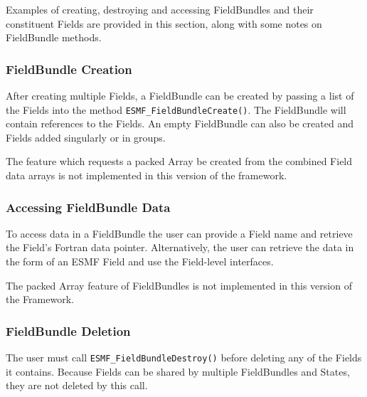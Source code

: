 

Examples of creating, destroying and accessing FieldBundles and their
constituent Fields are provided in this section, along with some
notes on FieldBundle methods.

\subsubsection{FieldBundle Creation}

After creating multiple Fields, a FieldBundle
can be created by passing a list of the Fields into the 
method {\tt ESMF\_FieldBundleCreate()}.  The FieldBundle will contain
references to the Fields.  An empty FieldBundle can also be created
and Fields added singularly or in groups. 

The feature which requests a packed Array be created from the
combined Field data arrays is not implemented in this version
of the framework.

\subsubsection{Accessing FieldBundle Data}

To access data in a FieldBundle the user can provide a Field
name and retrieve the Field's Fortran data pointer.  Alternatively,
the user can retrieve the data in the form of an ESMF 
Field and use the Field-level interfaces.

The packed Array feature of FieldBundles is not implemented in
this version of the Framework.

\subsubsection{FieldBundle Deletion}

The user must call {\tt ESMF\_FieldBundleDestroy()} before 
deleting any of the Fields it contains.  Because Fields
can be shared by multiple FieldBundles and States, they are
not deleted by this call.


